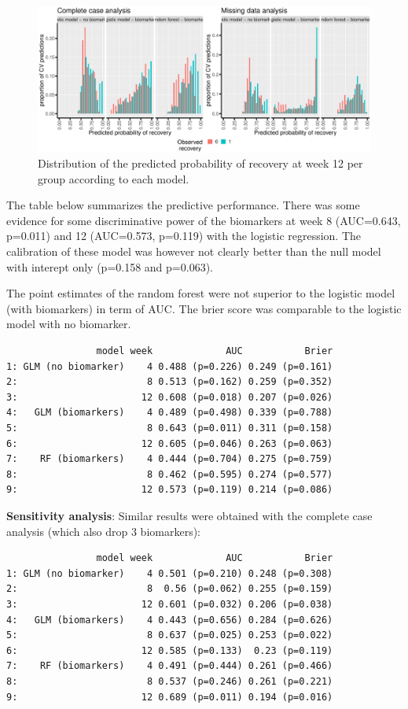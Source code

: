 \documentclass[12pt]{article}
\begin{document}
\begin{figure}[!h]
\centering
\includegraphics[trim={0 0 0 0},width=\textwidth]{./figures/hist-pred-week12.pdf}
\caption{\label{fig:perfW12-dens}Distribution of the predicted probability of recovery at week 12 per group according to each model.}
\end{figure}

The table below summarizes the predictive performance. There was some
evidence for some discriminative power of the biomarkers at week 8
(AUC=0.643, p=0.011) and 12 (AUC=0.573, p=0.119) with the logistic
regression. The calibration of these model was however not clearly
better than the null model with interept only (p=0.158 and
p=0.063).

\vfill

The point estimates of the random forest were not
superior to the logistic model (with biomarkers) in term of AUC. The
brier score was comparable to the logistic model with no biomarker.

\clearpage

\begin{verbatim}
                model week             AUC           Brier
1: GLM (no biomarker)    4 0.488 (p=0.226) 0.249 (p=0.161)
2:                       8 0.513 (p=0.162) 0.259 (p=0.352)
3:                      12 0.608 (p=0.018) 0.207 (p=0.026)
4:   GLM (biomarkers)    4 0.489 (p=0.498) 0.339 (p=0.788)
5:                       8 0.643 (p=0.011) 0.311 (p=0.158)
6:                      12 0.605 (p=0.046) 0.263 (p=0.063)
7:    RF (biomarkers)    4 0.444 (p=0.704) 0.275 (p=0.759)
8:                       8 0.462 (p=0.595) 0.274 (p=0.577)
9:                      12 0.573 (p=0.119) 0.214 (p=0.086)
\end{verbatim}

\bigskip

\textbf{Sensitivity analysis}: Similar results were obtained with the
complete case analysis (which also drop 3 biomarkers):
\begin{verbatim}
                model week             AUC           Brier
1: GLM (no biomarker)    4 0.501 (p=0.210) 0.248 (p=0.308)
2:                       8  0.56 (p=0.062) 0.255 (p=0.159)
3:                      12 0.601 (p=0.032) 0.206 (p=0.038)
4:   GLM (biomarkers)    4 0.443 (p=0.656) 0.284 (p=0.626)
5:                       8 0.637 (p=0.025) 0.253 (p=0.022)
6:                      12 0.585 (p=0.133)  0.23 (p=0.119)
7:    RF (biomarkers)    4 0.491 (p=0.444) 0.261 (p=0.466)
8:                       8 0.537 (p=0.246) 0.261 (p=0.221)
9:                      12 0.689 (p=0.011) 0.194 (p=0.016)
\end{verbatim}
\end{document}
